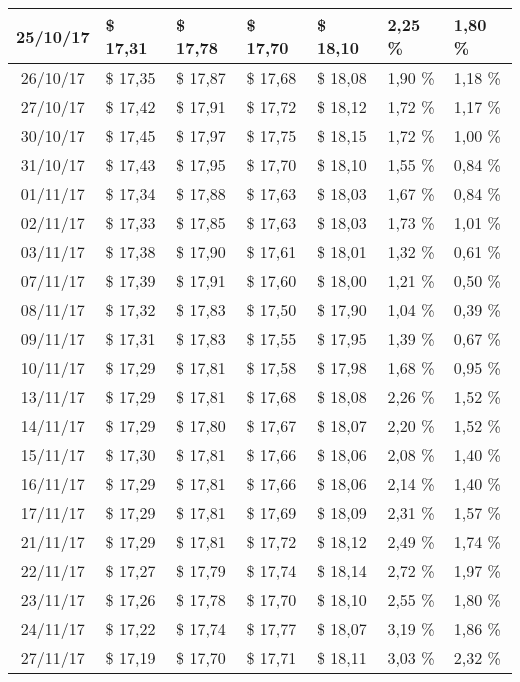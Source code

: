 \begin{center}
\begin{longtable}{|c|p{1.5cm}|p{1.5cm}|p{1.5cm}|p{1.5cm}|p{1.5cm}|p{1.5cm}|}
25/10/17 & \$ 17,31 & \$ 17,78 & \$ 17,70 & \$ 18,10 & 2,25 \% & 1,80 \% \\ \hline
26/10/17 & \$ 17,35 & \$ 17,87 & \$ 17,68 & \$ 18,08 & 1,90 \% & 1,18 \% \\ \hline
27/10/17 & \$ 17,42 & \$ 17,91 & \$ 17,72 & \$ 18,12 & 1,72 \% & 1,17 \% \\ \hline
30/10/17 & \$ 17,45 & \$ 17,97 & \$ 17,75 & \$ 18,15 & 1,72 \% & 1,00 \% \\ \hline
31/10/17 & \$ 17,43 & \$ 17,95 & \$ 17,70 & \$ 18,10 & 1,55 \% & 0,84 \% \\ \hline
01/11/17 & \$ 17,34 & \$ 17,88 & \$ 17,63 & \$ 18,03 & 1,67 \% & 0,84 \% \\ \hline
02/11/17 & \$ 17,33 & \$ 17,85 & \$ 17,63 & \$ 18,03 & 1,73 \% & 1,01 \% \\ \hline
03/11/17 & \$ 17,38 & \$ 17,90 & \$ 17,61 & \$ 18,01 & 1,32 \% & 0,61 \% \\ \hline
07/11/17 & \$ 17,39 & \$ 17,91 & \$ 17,60 & \$ 18,00 & 1,21 \% & 0,50 \% \\ \hline
08/11/17 & \$ 17,32 & \$ 17,83 & \$ 17,50 & \$ 17,90 & 1,04 \% & 0,39 \% \\ \hline
09/11/17 & \$ 17,31 & \$ 17,83 & \$ 17,55 & \$ 17,95 & 1,39 \% & 0,67 \% \\ \hline
10/11/17 & \$ 17,29 & \$ 17,81 & \$ 17,58 & \$ 17,98 & 1,68 \% & 0,95 \% \\ \hline
13/11/17 & \$ 17,29 & \$ 17,81 & \$ 17,68 & \$ 18,08 & 2,26 \% & 1,52 \% \\ \hline
14/11/17 & \$ 17,29 & \$ 17,80 & \$ 17,67 & \$ 18,07 & 2,20 \% & 1,52 \% \\ \hline
15/11/17 & \$ 17,30 & \$ 17,81 & \$ 17,66 & \$ 18,06 & 2,08 \% & 1,40 \% \\ \hline
16/11/17 & \$ 17,29 & \$ 17,81 & \$ 17,66 & \$ 18,06 & 2,14 \% & 1,40 \% \\ \hline
17/11/17 & \$ 17,29 & \$ 17,81 & \$ 17,69 & \$ 18,09 & 2,31 \% & 1,57 \% \\ \hline
21/11/17 & \$ 17,29 & \$ 17,81 & \$ 17,72 & \$ 18,12 & 2,49 \% & 1,74 \% \\ \hline
22/11/17 & \$ 17,27 & \$ 17,79 & \$ 17,74 & \$ 18,14 & 2,72 \% & 1,97 \% \\ \hline
23/11/17 & \$ 17,26 & \$ 17,78 & \$ 17,70 & \$ 18,10 & 2,55 \% & 1,80 \% \\ \hline
24/11/17 & \$ 17,22 & \$ 17,74 & \$ 17,77 & \$ 18,07 & 3,19 \% & 1,86 \% \\ \hline
27/11/17 & \$ 17,19 & \$ 17,70 & \$ 17,71 & \$ 18,11 & 3,03 \% & 2,32 \% \\ \hline

\end{longtable}
\end{center}

